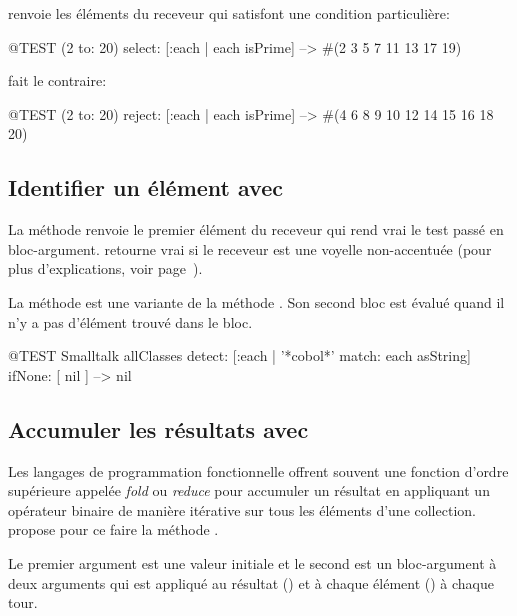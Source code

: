 \documentclass[a4paper,10pt,twoside]{book}
\begin{document}
 renvoie les éléments du receveur qui satisfont
une condition particulière:

\begin{code}{@TEST}
(2 to: 20) select: [:each | each isPrime] --> #(2 3 5 7 11 13 17 19)
\end{code}

 fait le contraire:
\begin{code}{@TEST}
(2 to: 20) reject: [:each | each isPrime] --> #(4 6 8 9 10 12 14 15 16 18 20)
\end{code}

\subsection{Identifier un élément avec }

La méthode  renvoie le premier
élément du receveur qui rend vrai le test passé en bloc-argument.
 retourne vrai \cad {} si le receveur est une
voyelle non-accentuée (pour plus d'explications, voir page~\pageref{def:isVowel}).

La méthode  est une variante de la méthode . 
Son second bloc est évalué quand il n'y a pas d'élément trouvé dans le bloc.

\begin{code}{@TEST}
Smalltalk allClasses detect: [:each | '*cobol*' match: each asString] ifNone: [ nil ] --> nil
\end{code} %

\subsection{Accumuler les résultats avec }
Les langages de programmation fonctionnelle offrent souvent une fonction d'ordre
supérieure appelée \emph{fold} ou \emph{reduce} pour accumuler un résultat
en appliquant un opérateur binaire de manière itérative sur tous les
éléments d'une collection.
\pharo propose pour ce faire la méthode .

Le premier argument est une valeur initiale et le second est un bloc-argument
à deux arguments qui est appliqué au résultat () et à chaque élément () à chaque tour.
\end{document}
